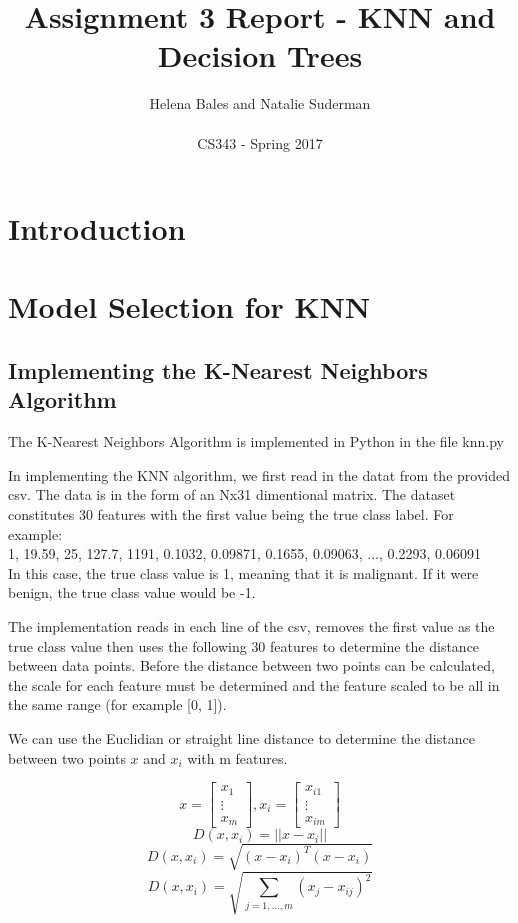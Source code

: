 \documentclass[letterpaper,10pt]{article}
\title{Assignment 3 Report - KNN and Decision Trees}
\author{Helena Bales and Natalie Suderman\\ \\ CS343 - Spring 2017}
\begin{document}
\maketitle

\tableofcontents
\clearpage

\section{Introduction}

\section{Model Selection for KNN}

\subsection{Implementing the K-Nearest Neighbors Algorithm}
The K-Nearest Neighbors Algorithm is implemented in Python in the file knn.py

In implementing the KNN algorithm, we first read in the datat from the provided csv. The data is 
in the form of an Nx31 dimentional matrix. The dataset constitutes 30 features with the first 
value being the true class label. For example:\\

1, 19.59, 25, 127.7, 1191, 0.1032, 0.09871, 0.1655, 0.09063, ..., 0.2293, 0.06091\\

In this case, the true class value is 1, meaning that it is malignant. If it were benign, the true
 class value would be -1.

The implementation reads in each line of the csv, removes the first value as the true class value 
then uses the following 30 features to determine the distance between data points. Before the 
distance between two points can be calculated, the scale for each feature must be determined and 
the feature scaled to be all in the same range (for example [0, 1]).

We can use the Euclidian or straight line distance to determine the distance between two points 
\(x\) and \(x_i\) with m features.

\[ x = \left[ \begin{array}{c} x_1 \\ \vdots \\ x_m \end{array} \right], x_i = \left[ \begin{array}{c} x_{i1} \\ \vdots \\ x_{im} \end{array} \right] \]
\[ D(x,x_i) = ||x - x_i|| \]
\[ D(x,x_i) = \sqrt{(x - x_i)^T(x - x_i)} \]
\[ D(x,x_i) = \sqrt{\sum_{j=1,...,m} (x_j - x_{ij})^2} \]
\end{document}
